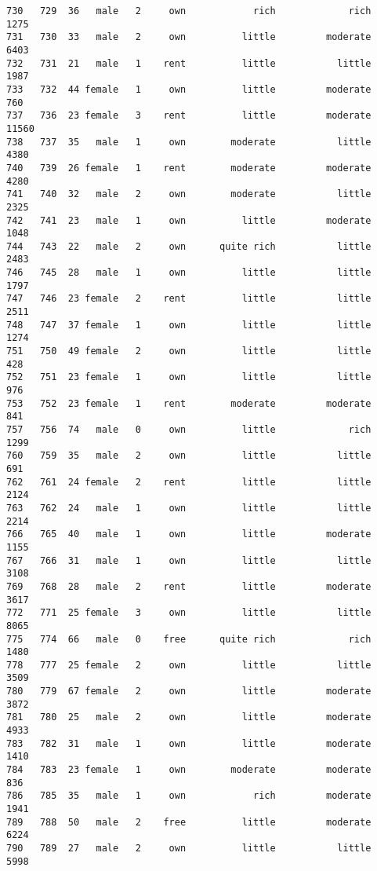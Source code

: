\documentclass[
]{article}
\begin{document}
\begin{verbatim}
730   729  36   male   2     own            rich             rich          1275
731   730  33   male   2     own          little         moderate          6403
732   731  21   male   1    rent          little           little          1987
733   732  44 female   1     own          little         moderate           760
737   736  23 female   3    rent          little         moderate         11560
738   737  35   male   1     own        moderate           little          4380
740   739  26 female   1    rent        moderate         moderate          4280
741   740  32   male   2     own        moderate           little          2325
742   741  23   male   1     own          little         moderate          1048
744   743  22   male   2     own      quite rich           little          2483
746   745  28   male   1     own          little           little          1797
747   746  23 female   2    rent          little           little          2511
748   747  37 female   1     own          little           little          1274
751   750  49 female   2     own          little           little           428
752   751  23 female   1     own          little           little           976
753   752  23 female   1    rent        moderate         moderate           841
757   756  74   male   0     own          little             rich          1299
760   759  35   male   2     own          little           little           691
762   761  24 female   2    rent          little           little          2124
763   762  24   male   1     own          little           little          2214
766   765  40   male   1     own          little         moderate          1155
767   766  31   male   1     own          little           little          3108
769   768  28   male   2    rent          little         moderate          3617
772   771  25 female   3     own          little           little          8065
775   774  66   male   0    free      quite rich             rich          1480
778   777  25 female   2     own          little           little          3509
780   779  67 female   2     own          little         moderate          3872
781   780  25   male   2     own          little         moderate          4933
783   782  31   male   1     own          little         moderate          1410
784   783  23 female   1     own        moderate         moderate           836
786   785  35   male   1     own            rich         moderate          1941
789   788  50   male   2    free          little         moderate          6224
790   789  27   male   2     own          little           little          5998

\end{verbatim}
\end{document}

